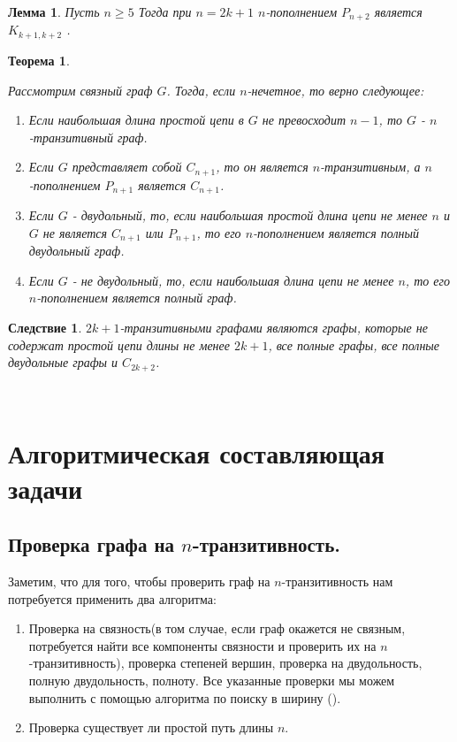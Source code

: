 \documentclass[a4paper,12pt]{article}
\theoremstyle{plain}
\newtheorem{theorem}{Теорема}
\newtheorem{lemma}{Лемма}
\newtheorem*{corollary*}{Следствие}
\theoremstyle{definition}
\begin{document}
	\begin{lemma} \label{l15}
		{\it Пусть $n \geq 5 $ Тогда при $n=2k+1$ $n$-пополнением $P_{n+2}$ является $K_{k+1,k+2}$   .}
	\end{lemma}
	
	
	
	
	\begin{theorem}\label{t4}
		{\it Рассмотрим связный граф $G$. Тогда, если $n$-нечетное, то верно следующее:
\begin{enumerate}
\item[1)] Если наибольшая длина простой цепи в $G$ не превосходит  $n-1$, то $G$ - $n$-транзитивный граф.
\item[2)] Если $G$ представляет собой $C_{n+1}$, то он является $n$-транзитивным, а $n$-пополнением $P_{n+1}$ является $C_{n+1}$.
\item[3)] Если $G$ - двудольный, то, если наибольшая простой длина цепи не менее $n$ и $G$ не является  $C_{n+1}$ или $P_{n+1}$, то его $n$-пополнением является полный двудольный граф.
\item[4)] Если $G$ - не двудольный, то, если наибольшая длина цепи не менее $n$, то его $n$-пополнением является полный граф.


\end{enumerate}}
	\end{theorem}
	
	\begin{corollary*}
		{\it $2k+1$-транзитивными графами являются графы, которые не содержат простой цепи длины не менее $2k+1$, все полные графы, все полные двудольные графы и $C_{2k+2}$.}
	\end{corollary*}
	\ \\
	 
	
	
\section*{{Алгоритмическая составляющая задачи}}
	 \subsection*{ Проверка графа на $n$-транзитивность.}
	 Заметим, что для того, чтобы проверить граф на $n$-транзитивность нам потребуется применить два алгоритма:
	 \begin{enumerate}
	     \item Проверка на связность(в том случае, если граф окажется не связным, потребуется найти все компоненты связности и проверить их на $n$-транзитивность), проверка степеней вершин,  проверка на двудольность, полную двудольность, полноту. Все указанные проверки мы можем выполнить с помощью алгоритма по поиску в ширину (\cite{11}).
	     \item Проверка существует ли простой путь длины $n$.
	 \end{enumerate}
	 
\end{document}
